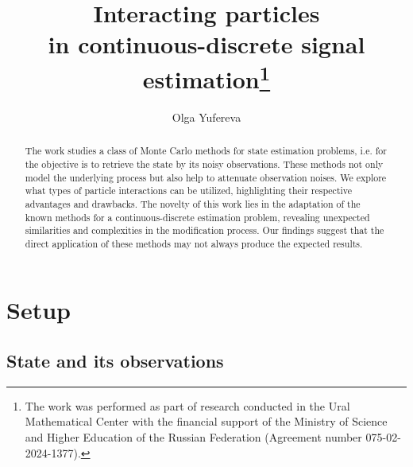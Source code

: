 \documentclass[12pt]{llncs}
\begin{document}
\fi

\title{Interacting particles \\in continuous-discrete signal estimation\thanks{The work was performed as part of research conducted
in the Ural Mathematical Center with the financial support
of the Ministry of Science and Higher Education of the Russian
Federation
(Agreement number 075-02-2024-1377).}
}

\author{Olga Yufereva
}

\maketitle

\begin{abstract}
The work studies a class of Monte Carlo methods for state estimation problems, i.e. for the objective is to retrieve the state by its noisy observations. These methods not only model the underlying process but also help to attenuate observation noises. 
We explore what types of particle interactions can be utilized, highlighting their respective advantages and drawbacks. The novelty of this work lies in the adaptation of the known methods for a continuous-discrete estimation problem, revealing unexpected similarities and complexities in the modification process. Our findings suggest that the direct application of these methods may not always produce the expected results.

\end{abstract}




\section{Setup}
\subsection{State and its observations}
\end{document}
